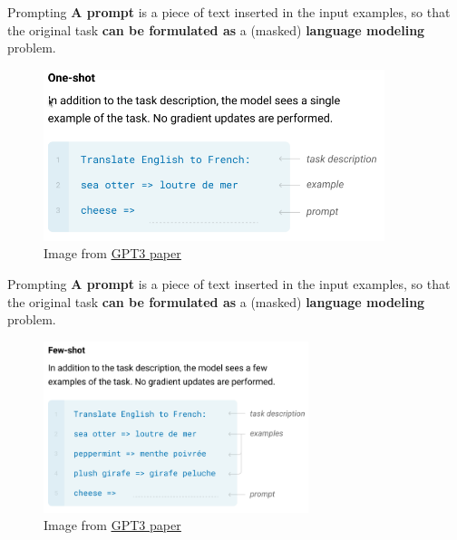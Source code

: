 \documentclass[12pt,aspectratio=169,handout]{beamer}
\begin{document}
\begin{frame}{Prompting}
	\textbf{A prompt} is a piece of text inserted in the input examples, so that the original task \textbf{can be formulated as} a (masked) \textbf{language modeling} problem.

	\begin{figure}[h]
		\includegraphics[height=5cm]{one-shot-translation-gpt3}
		\caption*{Image from \href{https://arxiv.org/pdf/2005.14165.pdf}{\underline{GPT3 paper}}}
	\end{figure}
	
\end{frame}


\begin{frame}{Prompting}
	\textbf{A prompt} is a piece of text inserted in the input examples, so that the original task \textbf{can be formulated as} a (masked) \textbf{language modeling} problem.

	\begin{figure}[h]
		\includegraphics[height=5cm]{few-shot-translation-gpt3}
		\caption*{Image from \href{https://arxiv.org/pdf/2005.14165.pdf}{\underline{GPT3 paper}}}
	\end{figure}
	
\end{frame}
\end{document}
